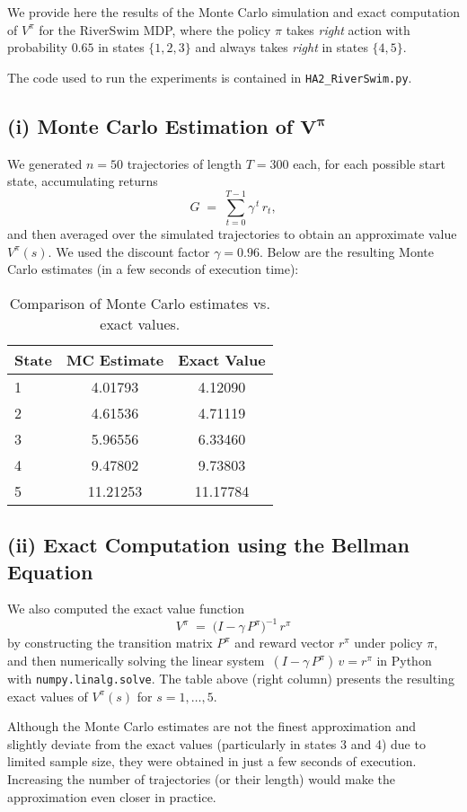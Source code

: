 We provide here the results of the Monte Carlo simulation and exact computation of 
\(V^\pi\) for the RiverSwim MDP, where the policy \(\pi\) takes \emph{right} action 
with probability \(0.65\) in states \(\{1,2,3\}\) and always takes \emph{right} 
in states \(\{4,5\}\).

The code used to run the experiments is contained in 
\texttt{HA2\_RiverSwim.py}.

\medskip

\noindent
\subsection*{(i) Monte Carlo Estimation of \(\boldsymbol{V^\pi}\)}

\noindent
We generated \(n=50\) trajectories of length \(T=300\) each, for each possible start state, 
accumulating returns
\[
  G \;=\;\sum_{t=0}^{T-1}\gamma^{\,t}\,r_t,
\]
and then averaged over the simulated trajectories to obtain 
an approximate value \(V^\pi(s)\). 
We used the discount factor \(\gamma = 0.96\). 
Below are the resulting Monte Carlo estimates (in a few seconds of execution time):

\begin{table}[H]
  \centering
  \begin{tabular}{l|c|c}
  \hline
  \textbf{State} & \textbf{MC Estimate} & \textbf{Exact Value} \\
  \hline
  1 & 4.01793 & 4.12090 \\
  2 & 4.61536 & 4.71119 \\
  3 & 5.96556 & 6.33460 \\
  4 & 9.47802 & 9.73803 \\
  5 & 11.21253 & 11.17784 \\
  \hline
  \end{tabular}
  \caption{Comparison of Monte Carlo estimates vs. exact values.}
  \label{tab:mc-vs-exact}
\end{table}
  

\noindent
\subsection*{(ii) Exact Computation using the Bellman Equation}

\noindent
We also computed the exact value function 
\[
   V^\pi \;=\;\bigl(I - \gamma\,P^\pi\bigr)^{-1}\,r^\pi
\]
by constructing the transition matrix \(P^\pi\) and reward vector \(r^\pi\) under policy 
\(\pi\), and then numerically solving the linear system 
\(\,(I - \gamma\,P^\pi)\,v = r^\pi\) in Python with \texttt{numpy.linalg.solve}. 
The table above (right column) presents the resulting exact values of 
\(V^\pi(s)\) for \(s=1,\dots,5.\)

\medskip

Although the Monte Carlo estimates are not the finest approximation and slightly deviate 
from the exact values (particularly in states 3 and 4) due to limited sample size, 
they were obtained in just a few seconds of execution. Increasing the number of trajectories 
(or their length) would make the approximation even closer in practice.